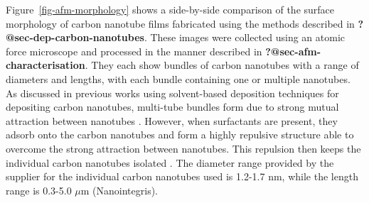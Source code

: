 \documentclass[
  a4paper,
]{scrbook}
\begin{document}
Figure~\ref{fig-afm-morphology} shows a side-by-side comparison of the
surface morphology of carbon nanotube films fabricated using the methods
described in \textbf{?@sec-dep-carbon-nanotubes}. These images were
collected using an atomic force microscope and processed in the manner
described in \textbf{?@sec-afm-characterisation}. They each show bundles
of carbon nanotubes with a range of diameters and lengths, with each
bundle containing one or multiple nanotubes. As discussed in previous
works using solvent-based deposition techniques for depositing carbon
nanotubes, multi-tube bundles form due to strong mutual attraction
between nanotubes
\autocite{Zheng2017,Thanihaichelvan2018,Thanihaichelvan2019,Nguyen2021}.
However, when surfactants are present, they adsorb onto the carbon
nanotubes and form a highly repulsive structure able to overcome the
strong attraction between nanotubes. This repulsion then keeps the
individual carbon nanotubes isolated
\autocite{Wenseleers2004,Shimizu2013}. The diameter range provided by
the supplier for the individual carbon nanotubes used is 1.2-1.7 nm,
while the length range is 0.3-5.0 \(\mu\)m (Nanointegris).
\end{document}
